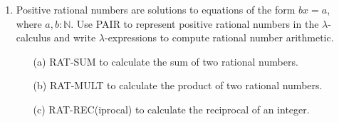 \documentclass[11pt]{report}
\begin{document}
\begin{enumerate}
	\item Positive rational numbers are solutions to equations of the form $bx = a$, where $a,b : \mathbb{N}$. Use PAIR to represent positive rational numbers in the $\lambda$-calculus and write $\lambda$-expressions to compute rational number arithmetic. 
		\begin{itemize}
			\item[(a)] RAT-SUM to calculate the sum of two rational numbers.
			\item[(b)] RAT-MULT to calculate the product of two rational numbers.
			\item[(c)] RAT-REC(iprocal) to calculate the reciprocal of an integer.
		\end{itemize}

%	

\end{enumerate}
	
\end{document}

